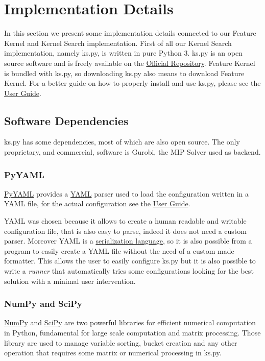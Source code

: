 
\newcommand{\userguide}{see the \href{https://github.com/Optimization-Algorithms/User-Guide}{User Guide}}

\section{Implementation Details}
    In this section we present some implementation details connected to our Feature Kernel and Kernel Search implementation.  
    First of all our Kernel Search implementation, namely ks.py, is written in pure Python 3. ks.py is an open source software and
    is freely available on the \href{https://github.com/Optimization-Algorithms/ks.py}{Official Repository}. 
    Feature Kernel is bundled with ks.py, so downloading ks.py also means to download Feature Kernel. For a better guide on 
    how to properly install and use ks.py, please \userguide.

    \subsection{Software Dependencies}
        ks.py has some dependencies, most of which are also open source. The only proprietary, and commercial, software is Gurobi, the MIP 
        Solver used as backend. 
        
        \subsubsection{PyYAML}
            \href{https://pyyaml.org/}{PyYAML} provides a \href{https://en.wikipedia.org/wiki/YAML}{YAML} parser used to load the configuration
            written in a YAML file, for the actual configuration \userguide.

            YAML was chosen because it allows to create a human readable and writable configuration file, that is also easy to parse, indeed it does not need a custom parser.
            Moreover YAML is a \href{https://en.wikipedia.org/wiki/Serialization}{serialization language}, so it is also possible from a program to easily create 
            a YAML file without the need of a custom made formatter. This allows the user to easily configure ks.py but it is also possible to write a \emph{runner} that
            automatically tries some configurations looking for the best solution with a minimal user intervention. 


        \subsubsection{NumPy and SciPy}
            \href{https://numpy.org/}{NumPy} and \href{https://www.scipy.org/scipylib/index.html}{SciPy} 
            are two powerful libraries for efficient numerical computation in Python, fundamental for large scale computation and matrix processing. Those library
            are used to manage variable sorting, bucket creation and any other operation that requires some matrix or numerical processing in ks.py. 

